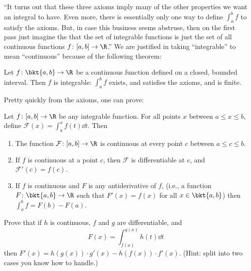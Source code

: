 \documentclass{ccg-topic}
\begin{document}
``It turns out that these three axioms imply many of the other properties we want an integral to have. Even more, there is essentially only one way to define $\int_a^b f$ to satisfy the axioms. But, in case this business seems abstruse, then on the first pass just imagine the that the set of integrable functions is just the set of all continuous functions $f \colon [a,b] \to \R$.''  We are justified in taking ``integrable'' to mean ``continuous'' because of the following theorem:

\begin{thm}
    \label{thm:sufficient_condition_for_integrability}
    Let $f \colon \bkt{a,b} \to \R$ be a continuous function defined on a closed, bounded interval. Then $f$ is integrable: $\int_a^b f$ exists, and satisfies the axioms, and is finite.
\end{thm}

Pretty quickly from the axioms, one can prove:

\begin{thm}
    \label{thm:fundamental_theorem_of_calculus}
    Let $f \colon [a,b] \to \R$ be any integrable function. For all points $x$ between $a \le x \le b$, define $\mathcal{F}(x) = \int_a^x f(t)\dd{t}$. Then \hfill
    \begin{enumerate}
        \item  The function $\mathcal{F} \colon [a,b] \to \R$ is continuous at every point $c$ between $a \le c \le b$.
        \item If $f$ is continuous at a point $c$, then $\mathcal{F}$ is differentiable at $c$, and $\mathcal{F}'(c) = f(c)$.
        \item If $f$ is continuous and $F$ is any antiderivative of $f$, (i.e., a function $F \colon \bkt{a,b} \to \R$ such that $F'(x) = f(x)$ for all $x \in \bkt{a,b}$) then $\int_a^b f = F(b) - F(a)$.
    \end{enumerate}
\end{thm}

\begin{todo}
    \label{todo:differentiating_the_definite_integral}
    Prove that if $h$ is continuous, $f$ and $g$ are differentiable, and 
    \begin{equation*}
        F(x) = \int_{f(x)}^{g(x)}h(t)\dd{t} 
    \end{equation*}
    then $F'(x) = h(g(x))\cdot g'(x) - h(f(x)) \cdot f'(x)$. (Hint: split into two cases you know how to handle.)
\end{todo}
\end{document}
